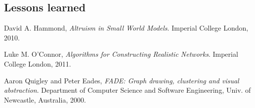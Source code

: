 \documentclass[a4paper,11pt,titlepage]{article}
\begin{document}
\subsection{Lessons learned}

\begin{thebibliography}{9}

  David A. Hammond,
  \emph{Altruism in Small World Models}.
  Imperial College London,
  2010.

  Luke M. O’Connor,
  \emph{Algorithms for Constructing Realistic Networks}.
  Imperial College London,
  2011.

  Aaron Quigley and Peter Eades,
  \emph{FADE: Graph drawing, clustering and visual abstraction}.
  Department of Computer Science and Software Engineering,
  Univ. of  Newcastle, Australia, 2000.

\end{thebibliography}
\end{document}
